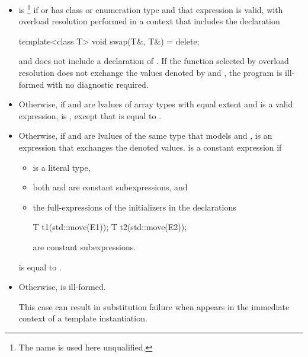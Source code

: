 \begin{itemize}
\item
   is \footnote{The name  is used
  here unqualified.} if  or 
  has class or enumeration type and that expression is valid, with
  overload resolution performed in a context that includes the declaration
\begin{codeblock}
template<class T>
  void swap(T&, T&) = delete;
\end{codeblock}
  and does not include a declaration of .
  If the function selected by overload resolution does not
  exchange the values denoted by
   and ,
  the program is ill-formed with no diagnostic required.

\item
  Otherwise, if  and 
  are lvalues of array types
  with equal extent and 
  is a valid expression,
   is ,
  except that
   is equal to
  .

\item
  Otherwise, if  and  are lvalues of the
  same type  that models  and
  ,
   is an expression that exchanges the denoted values.
   is a constant expression if
  \begin{itemize}
  \item {} is a literal type,
  \item both  and  are
    constant subexpressions, and
  \item the full-expressions of the initializers in the declarations
\begin{codeblock}
T t1(std::move(E1));
T t2(std::move(E2));
\end{codeblock}
are constant subexpressions.
  \end{itemize}
   is equal to
  .

\item
  Otherwise,  is ill-formed.
  \begin{note}
  This case can result in substitution failure when 
  appears in the immediate context of a template instantiation.
  \end{note}
\end{itemize}

